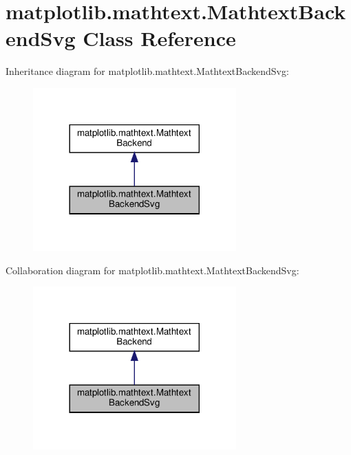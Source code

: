\hypertarget{classmatplotlib_1_1mathtext_1_1MathtextBackendSvg}{}\section{matplotlib.\+mathtext.\+Mathtext\+Backend\+Svg Class Reference}
\label{classmatplotlib_1_1mathtext_1_1MathtextBackendSvg}


Inheritance diagram for matplotlib.\+mathtext.\+Mathtext\+Backend\+Svg\+:
\nopagebreak
\begin{figure}[H]
\begin{center}
\leavevmode
\includegraphics[width=221pt]{classmatplotlib_1_1mathtext_1_1MathtextBackendSvg__inherit__graph}
\end{center}
\end{figure}


Collaboration diagram for matplotlib.\+mathtext.\+Mathtext\+Backend\+Svg\+:
\nopagebreak
\begin{figure}[H]
\begin{center}
\leavevmode
\includegraphics[width=221pt]{classmatplotlib_1_1mathtext_1_1MathtextBackendSvg__coll__graph}
\end{center}
\end{figure}
